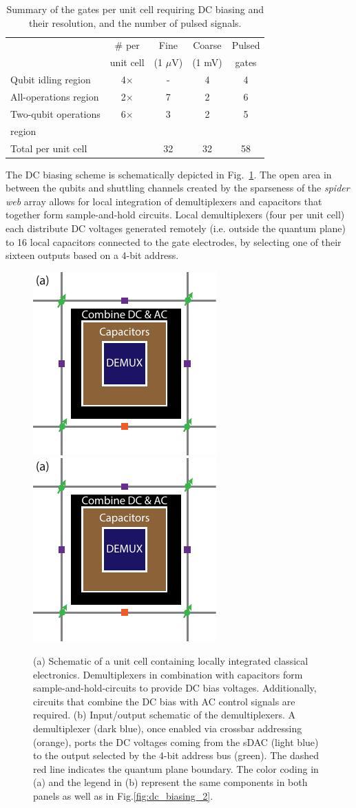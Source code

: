 \documentclass[aps,prl,reprint,superscriptaddress,floatfix]{revtex4-1}
\begin{document}
\begin{table}[b]
    \centering
    \begin{tabular}{l|c||c|c||c}
         & \# per & Fine & Coarse & Pulsed \\
         & unit cell & (1 $\mu$V) & (1 mV) & gates \\
        \hline \hline
        Qubit idling region & 4$\times$ & - & 4 & 4 \\
        \hline
        All-operations region & 2$\times$ & 7 & 2 & 6 \\
        \hline
        Two-qubit operations & 6$\times$ & 3 & 2 & 5 \\
        region & & & & \\
        \hline \hline
        Total per unit cell & & 32 & 32 & 58
    \end{tabular}
    \caption{Summary of the gates per unit cell requiring DC biasing and their resolution, and the number of pulsed signals.}
    \label{tab:DC_AC_count}
\end{table}

The DC biasing scheme is schematically depicted in Fig.~\ref{fig:dc_biasing_1}.
The open area in between the qubits and shuttling channels created by the sparseness of the \textit{spider web} array allows for local integration of demultiplexers and capacitors that together form sample-and-hold circuits.
Local demultiplexers (four per unit cell) each distribute DC voltages generated remotely (i.e. outside the quantum plane) to 16 local capacitors connected to the gate electrodes, by selecting one of their sixteen outputs based on a 4-bit address.

\begin{figure}[t]
    \centering
    \includegraphics[height=0.2\textwidth,page=1]{Figure_3_DC_biasing_1.pdf}
    \includegraphics[height=0.2\textwidth,page=2]{Figure_3_DC_biasing_1.pdf}
    \caption{(a) Schematic of a unit cell containing locally integrated classical electronics. Demultiplexers in combination with capacitors form sample-and-hold-circuits to provide DC bias voltages. Additionally, circuits that combine the DC bias with AC control signals are required. (b) Input/output schematic of the demultiplexers. A demultiplexer (dark blue), once enabled via crossbar addressing (orange), ports the DC voltages coming from the sDAC (light blue) to the output selected by the 4-bit address bus (green). The dashed red line indicates the quantum plane boundary. The color coding in (a) and the legend in (b) represent the same components in both panels as well as in Fig.\ref{fig:dc_biasing_2}.}
    \label{fig:dc_biasing_1}
\end{figure}
\end{document}
